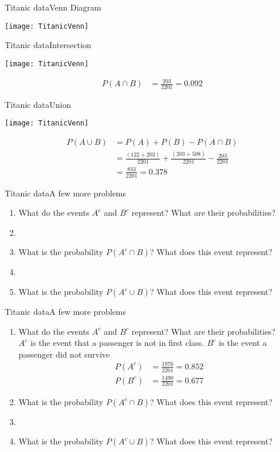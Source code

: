 \documentclass[xcolor=dvipsnames]{beamer}
\begin{document}
\begin{frame}{Titanic data}{Venn Diagram}
	\begin{center}
		\texttt{[image: TitanicVenn]}
	\end{center}
\end{frame}

\begin{frame}{Titanic data}{Intersection}
\begin{center}
	\texttt{[image: TitanicVenn]}
\end{center}
\begin{align*}
P(A \cap B) &= \frac{203}{2201} = 0.092 
\end{align*}
\end{frame}

\begin{frame}{Titanic data}{Union}
\begin{center}
	\texttt{[image: TitanicVenn]}
\end{center}
\begin{align*}
	P(A \cup B) &= P(A) + P(B) - P(A\cap B)\\ 
	&= \frac{(122 + 203)}{2201} + \frac{(203 + 508)}{2201} - \frac{203}{2201} \\ 
	&= \frac{833}{2201} = 0.378
\end{align*}
\end{frame}

\begin{frame}{Titanic data}{A few more problems}
	\begin{enumerate}
		\item What do the events $A^c$ and $B^c$ represent? What are their probabilities? 
		\item[]
		\item What is the probability $P(A^c \cap B)$? What does this event represent? 
		\item[] 
		\item What is the probability $P(A^c \cup B)$? What does this event represent?
	\end{enumerate}
\end{frame}

\begin{frame}{Titanic data}{A few more problems}
\begin{enumerate}
	\item What do the events $A^c$ and $B^c$ represent? What are their probabilities?\\
	$A^c$ is the event that a passenger is not in first class. $B^c$ is the event a passenger did not survive \pause
	\begin{align*}
		P(A^c) &= \frac{1876}{2201} = 0.852 \\
		P(B^c) &= \frac{1490}{2201} = 0.677
	\end{align*}
	\item What is the probability $P(A^c \cap B)$? What does this event represent? 
	\item[] 
	\item What is the probability $P(A^c \cup B)$? What does this event represent?
\end{enumerate}
\end{frame}
\end{document}
